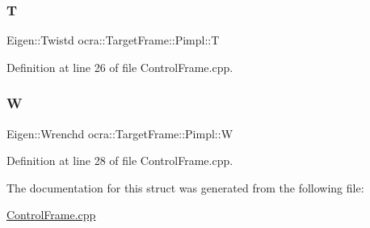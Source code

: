\subsubsection{\texorpdfstring{T}{T}}
{\footnotesize\ttfamily Eigen\+::\+Twistd ocra\+::\+Target\+Frame\+::\+Pimpl\+::T}



Definition at line 26 of file Control\+Frame.\+cpp.

\hypertarget{structocra_1_1TargetFrame_1_1Pimpl_a4ff4bfb5366d48f34539e73fa7b18351}{}\label{structocra_1_1TargetFrame_1_1Pimpl_a4ff4bfb5366d48f34539e73fa7b18351} 
\subsubsection{\texorpdfstring{W}{W}}
{\footnotesize\ttfamily Eigen\+::\+Wrenchd ocra\+::\+Target\+Frame\+::\+Pimpl\+::W}



Definition at line 28 of file Control\+Frame.\+cpp.



The documentation for this struct was generated from the following file\+:\begin{DoxyCompactItemize}
\item 
\hyperlink{ControlFrame_8cpp}{Control\+Frame.\+cpp}\end{DoxyCompactItemize}
